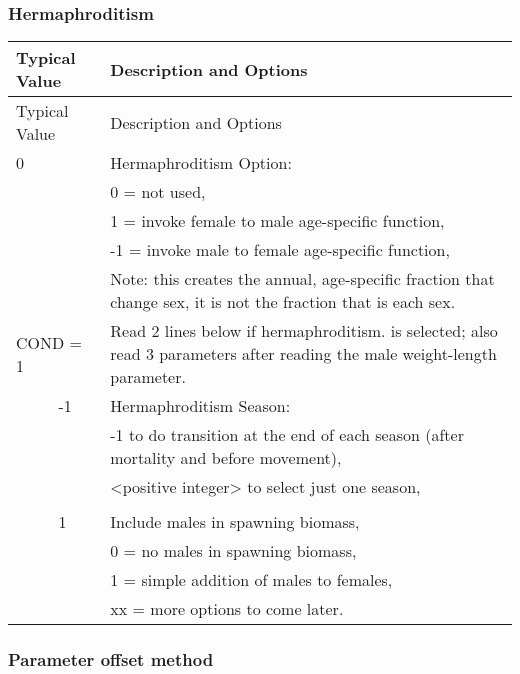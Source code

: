 \subsubsection{Hermaphroditism}

\begin{longtable}{p{0.5cm} p{2cm} p{13cm}}
	\hline	
	\multicolumn{2}{l}{Typical Value} & Description and Options\Tstrut\Bstrut\\
	\hline
	\endfirsthead

	\hline
	\multicolumn{2}{l}{Typical Value} & Description and Options\Tstrut\Bstrut\\
	\hline
	\endhead
	\hline

	\endfoot
	
	\endlastfoot

	0 & & Hermaphroditism Option:\Tstrut\\
	 &  & 0 = not used, \\
	 &  & 1 = invoke female to male age-specific function, \\
	 &  & -1 = invoke male to female age-specific function, \\
	 &  & Note:  this creates the annual, age-specific fraction that change sex, it is not the fraction that is each sex.\Bstrut\\
	\hline

	\multicolumn{2}{l}{COND = 1} \Tstrut & Read 2 lines below if hermaphroditism. is selected; also read 3 parameters after reading the male weight-length parameter.\Bstrut\\
	& -1 & Hermaphroditism Season: \\
	&    & -1 to do transition at the end of each season (after mortality and before movement),\\
	&    & <positive integer> to select just one season,\\
	\\
	& 1  & Include males in spawning biomass, \\
	&    & 0 = no males in spawning biomass, \\
	&    & 1 = simple addition of males to females,\\
	&    & xx = more options to come later. \Bstrut\\
	\hline
\end{longtable}


\subsubsection{Parameter offset method}


